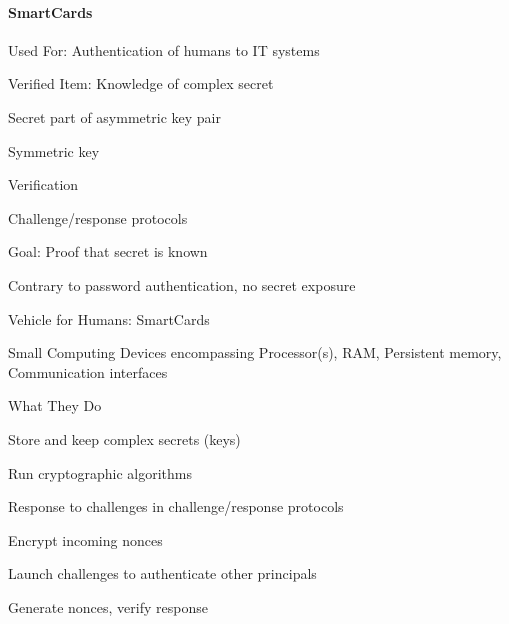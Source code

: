 \documentclass[a4paper]{article}
\begin{document}
\begin{multicols}{3}
    \paragraph{SmartCards}
    \begin{itemize*}
        \item Used For: Authentication of humans to IT systems
        \item Verified Item: Knowledge of complex secret
        \begin{itemize*}
            \item Secret part of asymmetric key pair
            \item Symmetric key
        \end{itemize*}
        \item Verification
        \begin{itemize*}
            \item Challenge/response protocols
            \item Goal: Proof that secret is known
            \item Contrary to password authentication, no secret exposure
        \end{itemize*}
    \end{itemize*}

    Vehicle for Humans: SmartCards
    \begin{itemize*}
        \item Small Computing Devices encompassing Processor(s), RAM, Persistent memory, Communication interfaces
        \item What They Do
        \begin{itemize*}
            \item Store and keep complex secrets (keys)
            \item Run cryptographic algorithms
            \begin{itemize*}
                \item Response to challenges in challenge/response protocols
                \item Encrypt incoming nonces
            \end{itemize*}
            \item Launch challenges to authenticate other principals
            \begin{itemize*}
                \item Generate nonces, verify response
            \end{itemize*}
        \end{itemize*}
    \end{itemize*}


\end{multicols}
\end{document}
